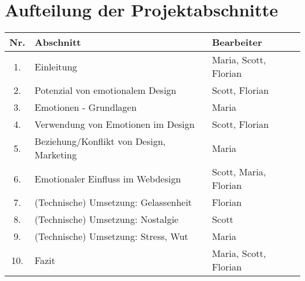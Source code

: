 \documentclass[./dokumentation.tex]{subfiles}
\begin{document}
\section{Aufteilung der Projektabschnitte}
\begin{center}
    \begin{tabular}{c | l | l}
            Nr. & Abschnitt                                       & Bearbeiter \\
            \hline
            1.  & Einleitung                                      & Maria, Scott, Florian \\
            2.  & Potenzial von emotionalem Design                & Scott, Florian \\
            3.  & Emotionen - Grundlagen                          & Maria  \\
            4.  & Verwendung von Emotionen im Design              & Scott, Florian\\
            5.  & Beziehung/Konflikt von Design, Marketing        & Maria\\
            6.  & Emotionaler Einfluss im Webdesign               & Scott, Maria, Florian\\
            7.  & (Technische) Umsetzung: Gelassenheit            & Florian\\
            8.  & (Technische) Umsetzung: Nostalgie               & Scott \\
            9.  & (Technische) Umsetzung: Stress, Wut             & Maria  \\
            10. & Fazit                                           & Maria, Scott, Florian \\
    \end{tabular} \\
\end{center}
\end{document}
